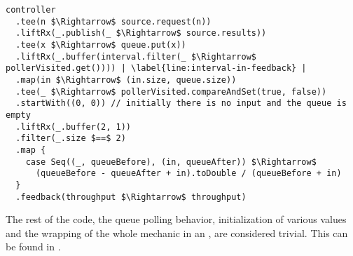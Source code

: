 \begin{minipage}{\linewidth}
\begin{lstlisting}[style=ScalaStyle, caption={Feedback system for controlling the buffer}, label={lst:buffer-feedback-control}]
controller
  .tee(n $\Rightarrow$ source.request(n))
  .liftRx(_.publish(_ $\Rightarrow$ source.results))
  .tee(x $\Rightarrow$ queue.put(x))
  .liftRx(_.buffer(interval.filter(_ $\Rightarrow$ pollerVisited.get()))) | \label{line:interval-in-feedback} |
  .map(in $\Rightarrow$ (in.size, queue.size))
  .tee(_ $\Rightarrow$ pollerVisited.compareAndSet(true, false))
  .startWith((0, 0)) // initially there is no input and the queue is empty
  .liftRx(_.buffer(2, 1))
  .filter(_.size $==$ 2)
  .map {
    case Seq((_, queueBefore), (in, queueAfter)) $\Rightarrow$
      (queueBefore - queueAfter + in).toDouble / (queueBefore + in)
  }
  .feedback(throughput $\Rightarrow$ throughput)
\end{lstlisting}
\end{minipage}

The rest of the code, the queue polling behavior, initialization of various values and the wrapping of the whole mechanic in an , are considered trivial. This can be found in .
